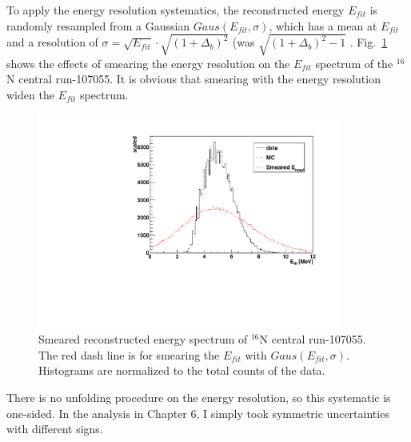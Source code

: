 To apply the energy resolution systematics, the reconstructed energy $E_{fit}$ is randomly resampled from a Gaussian $Gaus(E_{fit},\sigma)$, which has a mean at $E_{fit}$ and a resolution of $\sigma=\sqrt{E_{fit}}\cdot\sqrt{(1+\Delta_{b})^2}$ (was $\sqrt{(1+\Delta_{b})^2-1}$ . Fig.~\ref{fig:EresolSmear} shows the effects of smearing the energy resolution on the $E_{fit}$ spectrum of the $^{16}$N central run-107055. It is obvious that smearing with the energy resolution widen the $E_{fit}$ spectrum. 
\begin{figure}
	\centering
	\includegraphics[width=10cm]{SmearedEresol_N16_1.pdf}
	\caption[Smeared reconstructed energy spectrum of $^{16}$N central run-107055.]{Smeared reconstructed energy spectrum of $^{16}$N central run-107055. The red dash line is for smearing the $E_{fit}$ with $Gaus(E_{fit},\sigma)$. Histograms are normalized to the total counts of the data.}
	\label{fig:EresolSmear}
\end{figure}

There is no unfolding procedure on the energy resolution, so this systematic is one-sided\cite{marzec2019measurement}. In the analysis in Chapter 6, I simply took symmetric uncertainties with different signs.

%
%

